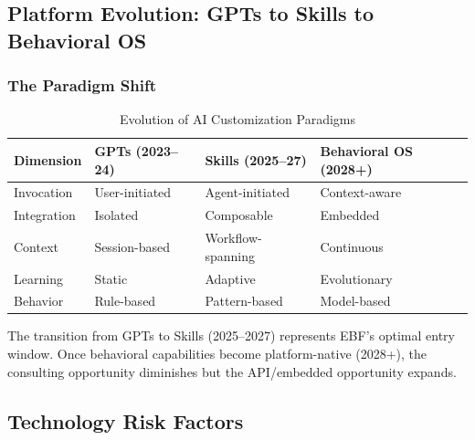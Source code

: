 
\subsection{Platform Evolution: GPTs to Skills to Behavioral OS}

\subsubsection{The Paradigm Shift}

\begin{table}[htbp]
\centering
\caption{Evolution of AI Customization Paradigms}
\begin{tabular}{@{}p{2.5cm}p{3.5cm}p{3.5cm}p{3.5cm}@{}}
\toprule
\textbf{Dimension} & \textbf{GPTs (2023--24)} & \textbf{Skills (2025--27)} & \textbf{Behavioral OS (2028+)} \\
\midrule
Invocation & User-initiated & Agent-initiated & Context-aware \\
Integration & Isolated & Composable & Embedded \\
Context & Session-based & Workflow-spanning & Continuous \\
Learning & Static & Adaptive & Evolutionary \\
Behavior & Rule-based & Pattern-based & Model-based \\
\bottomrule
\end{tabular}
\end{table}

\begin{tcolorbox}[colback=green!5,colframe=green!50,title=Strategic Window]
The transition from GPTs to Skills (2025--2027) represents EBF's optimal
entry window. Once behavioral capabilities become platform-native (2028+),
the consulting opportunity diminishes but the API/embedded opportunity expands.
\end{tcolorbox}


\subsection{Technology Risk Factors}


